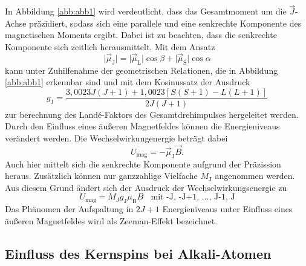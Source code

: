 In Abbildung \ref{abb:abb1} wird verdeutlicht, dass das Gesamtmoment um die $\vec J$-Achse präzidiert, sodass sich eine parallele und eine senkrechte Komponente des magnetischen Moments ergibt.
Dabei ist zu beachten, dass die senkrechte Komponente sich zeitlich herausmittelt. Mit dem Ansatz
\begin{equation}
  \big \vert\vec \mu_\text{J}\big \vert=\big \vert\vec \mu_\text{L}\big \vert\cos{\beta}+ \big \vert\vec \mu_\text{S}\big \vert \cos{\alpha}
\end{equation}
kann unter Zuhilfenahme der geometrischen Relationen, die in Abbildung \ref{abb:abb1} erkennbar sind und mit dem Kosinussatz der Ausdruck
\begin{equation}
  g_\text{J}=\frac{3,0023J(J+1)+1,0023[S(S+1)-L(L+1)]}{2J(J+1)}
\end{equation}
zur berechnung des Landé-Faktors des Gesamtdrehimpulses hergeleitet werden.
Durch den Einfluss eines äußeren Magnetfeldes können die Energieniveaus verändert werden. Die Wechselwirkungenergie beträgt dabei
\begin{equation}
  U_\text{mag}=-\vec\mu_\text{J} \vec B.
\end{equation}
Auch hier mittelt sich die senkrechte Komponente aufgrund der Präzission heraus. Zusätzlich können nur ganzzahlige Vielfache $M_\text{J}$ angenommen werden. Aus diesem Grund ändert sich der Ausdruck der
Wechselwirkungsenergie zu
\begin{equation}
  U_\text{mag}=M_\text{J}g_\text{J}\mu_\text{B}B ~~~~\text{mit -J, -J+1, ..., J-1, J}
\end{equation}
Das Phänomen der Aufspaltung in $2J+1$ Energieniveaus unter Einfluss eines äußeren Magnetfeldes wird als Zeeman-Effekt bezeichnet.

\subsection{Einfluss des Kernspins bei Alkali-Atomen}

